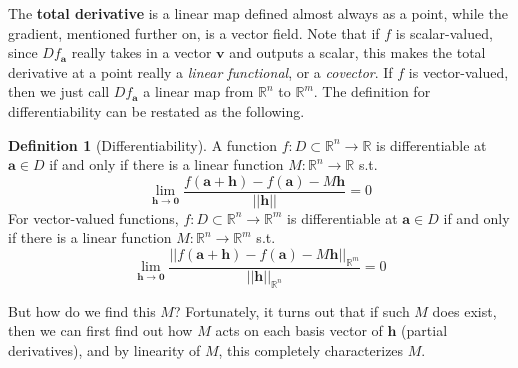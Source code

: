 \documentclass{article}
\theoremstyle{remark}
\theoremstyle{definition}
\newtheorem{definition}{Definition}[section]
\begin{document}
The \textbf{total derivative} is a linear map defined almost always as a point, while the gradient, mentioned further on, is a vector field. Note that if $f$ is scalar-valued, since $D f_\mathbf{a}$ really takes in a vector $\mathbf{v}$ and outputs a scalar, this makes the total derivative at a point really a \textit{linear functional}, or a \textit{covector}. If $f$ is vector-valued, then we just call $D f_\mathbf{a}$ a linear map from $\mathbb{R}^n$ to $\mathbb{R}^m$. The definition for differentiability can be restated as the following. 

\begin{definition}[Differentiability]
A function $f: D \subset \mathbb{R}^n \longrightarrow \mathbb{R}$ is differentiable at $\mathbf{a} \in D$ if and only if there is a linear function $M: \mathbb{R}^n \longrightarrow \mathbb{R}$ s.t. 
\[\lim_{\mathbf{h} \rightarrow \mathbf{0}} \frac{f(\mathbf{a} + \mathbf{h}) - f(\mathbf{a}) - M \mathbf{h}}{||\mathbf{h}||} = 0\]
For vector-valued functions, $f: D \subset \mathbb{R}^n \longrightarrow \mathbb{R}^m$ is differentiable at $\mathbf{a} \in D$ if and only if there is a linear function $M: \mathbb{R}^n \longrightarrow \mathbb{R}^m$ s.t. 
\[\lim_{\mathbf{h} \rightarrow \mathbf{0}} \frac{||f(\mathbf{a} + \mathbf{h}) - f(\mathbf{a}) - M \mathbf{h}||_{\mathbb{R}^m}}{||\mathbf{h}||_{\mathbb{R}^n}} = 0\]
\end{definition}

But how do we find this $M$? Fortunately, it turns out that if such $M$ does exist, then we can first find out how $M$ acts on each basis vector of $\mathbf{h}$ (partial derivatives), and by linearity of $M$, this completely characterizes $M$. 
\end{document}
